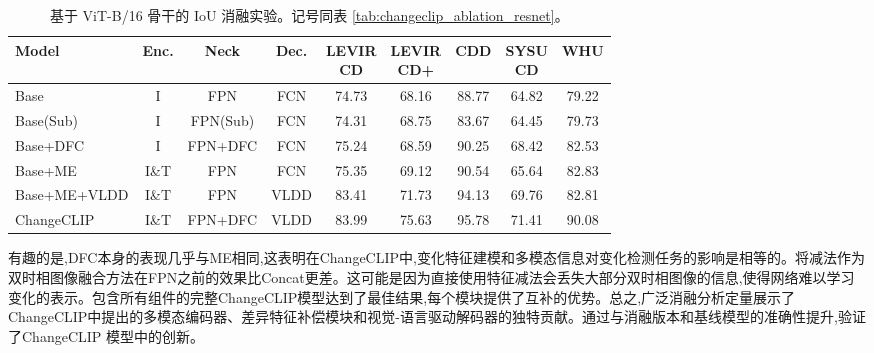 \begin{table}[!htbp]
\centering
\small
\setlength{\tabcolsep}{2pt}
\caption{基于 ViT-B/16 骨干的 IoU 消融实验。记号同表 \ref{tab:changeclip_ablation_resnet}。}
\label{tab:changeclip_ablation_vit}
\begin{tabular}{@{}l c c c *{5}{c}@{}}
\toprule
\textbf{Model} & \textbf{Enc.} & \textbf{Neck} & \textbf{Dec.} &
\makecell{\textbf{LEVIR}\\\textbf{CD}} &
\makecell{\textbf{LEVIR}\\\textbf{CD+}} &
\textbf{CDD} &
\makecell{\textbf{SYSU}\\\textbf{CD}} &
\textbf{WHU} \\
\midrule
Base            & I     & FPN       & FCN  & 74.73 & 68.16 & 88.77 & 64.82 & 79.22 \\
Base(Sub)       & I     & FPN(Sub)  & FCN  & 74.31 & 68.75 & 83.67 & 64.45 & 79.73 \\
Base+DFC        & I     & FPN+DFC   & FCN  & 75.24 & 68.59 & 90.25 & 68.42 & 82.53 \\
Base+ME         & I\&T  & FPN       & FCN  & 75.35 & 69.12 & 90.54 & 65.64 & 82.83 \\
Base+ME+VLDD    & I\&T  & FPN       & VLDD & 83.41 & 71.73 & 94.13 & 69.76 & 82.81 \\
ChangeCLIP      & I\&T  & FPN+DFC   & VLDD & 83.99 & 75.63 & 95.78 & 71.41 & 90.08 \\
\bottomrule
\end{tabular}
\end{table}




有趣的是,DFC本身的表现几乎与ME相同,这表明在ChangeCLIP中,变化特征建模和多模态信息对变化检测任务的影响是相等的。将减法作为双时相图像融合方法在FPN之前的效果比Concat更差。这可能是因为直接使用特征减法会丢失大部分双时相图像的信息,使得网络难以学习变化的表示。包含所有组件的完整ChangeCLIP模型达到了最佳结果,每个模块提供了互补的优势。总之,广泛消融分析定量展示了ChangeCLIP中提出的多模态编码器、差异特征补偿模块和视觉-语言驱动解码器的独特贡献。通过与消融版本和基线模型的准确性提升,验证了ChangeCLIP 模型中的创新。

